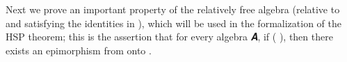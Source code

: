 \begin{code}
\AgdaSymbol{)}\<%
\\
%
\>[1]\AgdaSpace{}%
\AgdaSymbol{\{}\AgdaSpace{}%
\AgdaSymbol{=}\AgdaSpace{}%
\AgdaSymbol{\}}\AgdaSpace{}%
\AgdaSymbol{\{}\AgdaSpace{}%
\AgdaOperator{\AgdaInductiveConstructor{,}}\AgdaSpace{}%
\AgdaSymbol{\}}\AgdaSpace{}%
\AgdaSpace{}%
\AgdaSpace{}%
\AgdaSpace{}%
\AgdaSymbol{=}\AgdaSpace{}%
\AgdaSymbol{\{}\AgdaSpace{}%
\AgdaSymbol{=}\AgdaSpace{}%
\AgdaSymbol{\}\{}\AgdaSpace{}%
\AgdaSymbol{=}\AgdaSpace{}%
\AgdaSymbol{\}\{}\AgdaSymbol{\}}\AgdaSpace{}%
\AgdaSymbol{(}\AgdaSpace{}%
\AgdaSymbol{)}\AgdaSpace{}%
\AgdaSpace{}%
\<%
\\
\>[1][@{}l@{\AgdaIndent{0}}]%
\>[2]\<%
\\
%
\>[2]\AgdaSpace{}%
\AgdaSymbol{:}\AgdaSpace{}%
\AgdaSpace{}%
\AgdaSymbol{\}}\AgdaSpace{}%
\AgdaSpace{}%
\AgdaSymbol{(}\AgdaSpace{}%
\AgdaSymbol{)}\AgdaSpace{}%
\AgdaSpace{}%
\AgdaSpace{}%
\AgdaSpace{}%
\AgdaSpace{}%
\AgdaSpace{}%
\AgdaSpace{}%
\AgdaSpace{}%
\AgdaSpace{}%
\AgdaSpace{}%
\AgdaSpace{}%
\AgdaSpace{}%
\<%
\\
%
\>[2]\AgdaSpace{}%
\AgdaSpace{}%
\AgdaSpace{}%
\AgdaSpace{}%
\AgdaSymbol{=}\AgdaSpace{}%
\AgdaSpace{}%
\AgdaSpace{}%
\AgdaSpace{}%
\AgdaSpace{}%
\AgdaSpace{}%
\AgdaSpace{}%
\AgdaSpace{}%
\AgdaSpace{}%
\AgdaSymbol{)}\AgdaSpace{}%
\AgdaSpace{}%
\AgdaSpace{}%
\AgdaSpace{}%
\AgdaSpace{}%
\AgdaSymbol{(}\AgdaSpace{}%
\AgdaSymbol{)}\AgdaSpace{}%
\<%
\\
\>[0]\<%
\end{code}
Next we prove an important property of the relatively free algebra (relative to  and satisfying the identities in  ), which will be used in the formalization of the HSP theorem; this is the assertion that for every algebra 𝑨, if    ( ), then there exists an epimorphism from  onto .

